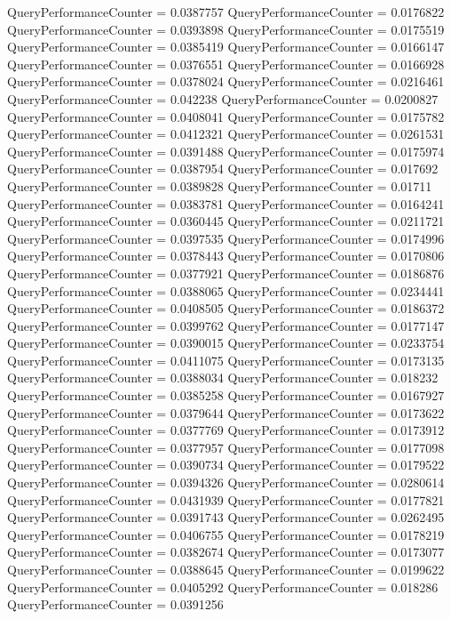 \documentclass[9pt]{article}
\theoremstyle{plain}
\theoremstyle{definition}
\theoremstyle{remark}
\numberwithin{equation}{section}
\begin{document}
QueryPerformanceCounter  =  0.0387757
QueryPerformanceCounter  =  0.0176822
QueryPerformanceCounter  =  0.0393898
QueryPerformanceCounter  =  0.0175519
QueryPerformanceCounter  =  0.0385419
QueryPerformanceCounter  =  0.0166147
QueryPerformanceCounter  =  0.0376551
QueryPerformanceCounter  =  0.0166928
QueryPerformanceCounter  =  0.0378024
QueryPerformanceCounter  =  0.0216461
QueryPerformanceCounter  =  0.042238
QueryPerformanceCounter  =  0.0200827
QueryPerformanceCounter  =  0.0408041
QueryPerformanceCounter  =  0.0175782
QueryPerformanceCounter  =  0.0412321
QueryPerformanceCounter  =  0.0261531
QueryPerformanceCounter  =  0.0391488
QueryPerformanceCounter  =  0.0175974
QueryPerformanceCounter  =  0.0387954
QueryPerformanceCounter  =  0.017692
QueryPerformanceCounter  =  0.0389828
QueryPerformanceCounter  =  0.01711
QueryPerformanceCounter  =  0.0383781
QueryPerformanceCounter  =  0.0164241
QueryPerformanceCounter  =  0.0360445
QueryPerformanceCounter  =  0.0211721
QueryPerformanceCounter  =  0.0397535
QueryPerformanceCounter  =  0.0174996
QueryPerformanceCounter  =  0.0378443
QueryPerformanceCounter  =  0.0170806
QueryPerformanceCounter  =  0.0377921
QueryPerformanceCounter  =  0.0186876
QueryPerformanceCounter  =  0.0388065
QueryPerformanceCounter  =  0.0234441
QueryPerformanceCounter  =  0.0408505
QueryPerformanceCounter  =  0.0186372
QueryPerformanceCounter  =  0.0399762
QueryPerformanceCounter  =  0.0177147
QueryPerformanceCounter  =  0.0390015
QueryPerformanceCounter  =  0.0233754
QueryPerformanceCounter  =  0.0411075
QueryPerformanceCounter  =  0.0173135
QueryPerformanceCounter  =  0.0388034
QueryPerformanceCounter  =  0.018232
QueryPerformanceCounter  =  0.0385258
QueryPerformanceCounter  =  0.0167927
QueryPerformanceCounter  =  0.0379644
QueryPerformanceCounter  =  0.0173622
QueryPerformanceCounter  =  0.0377769
QueryPerformanceCounter  =  0.0173912
QueryPerformanceCounter  =  0.0377957
QueryPerformanceCounter  =  0.0177098
QueryPerformanceCounter  =  0.0390734
QueryPerformanceCounter  =  0.0179522
QueryPerformanceCounter  =  0.0394326
QueryPerformanceCounter  =  0.0280614
QueryPerformanceCounter  =  0.0431939
QueryPerformanceCounter  =  0.0177821
QueryPerformanceCounter  =  0.0391743
QueryPerformanceCounter  =  0.0262495
QueryPerformanceCounter  =  0.0406755
QueryPerformanceCounter  =  0.0178219
QueryPerformanceCounter  =  0.0382674
QueryPerformanceCounter  =  0.0173077
QueryPerformanceCounter  =  0.0388645
QueryPerformanceCounter  =  0.0199622
QueryPerformanceCounter  =  0.0405292
QueryPerformanceCounter  =  0.018286
QueryPerformanceCounter  =  0.0391256
\end{document}
